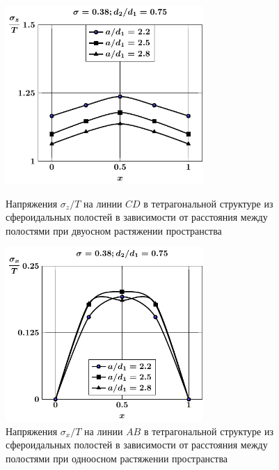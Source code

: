 \begin{figure}[h!]
\centering\footnotesize
\parbox[b]{7.5cm}{\centering\includegraphics[width=7.5cm]{cav8-a-d75-t1-sig_z-cd.pdf}
\caption{Напряжения $\sigma_z/T$ на линии $CD$ в тетрагональной структуре из сфероидальных полостей в зависимости от расстояния между полостями при двуосном растяжении пространства
\label{f:9:29}}}\hfil\hfil
\parbox[b]{7.5cm}{\centering\includegraphics[width=7.5cm]{cav8-a-d75-t1-sig_x-ab.pdf}
\caption{Напряжения $\sigma_x/T$ на линии $AB$ в тетрагональной структуре из сфероидальных полостей в зависимости от расстояния между полостями при одноосном растяжении пространства
\label{f:9:30}}}
\end{figure}

%

